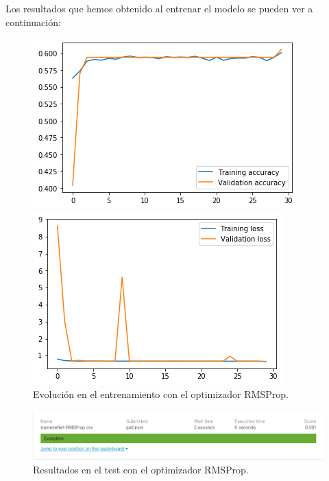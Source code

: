 \documentclass[11pt,a4paper]{article}
\begin{document}
Los resultados que hemos obtenido al entrenar el modelo se pueden ver a continuación:

\begin{figure}[H]
\centering
\begin{minipage}{0.5\textwidth}
  \centering
  \includegraphics[scale=0.5]{img/accuracy-rmsprop.png}
\end{minipage}%
\begin{minipage}{0.5\textwidth}
  \centering
  \includegraphics[scale=0.5]{img/loss-rmsprop.png}
\end{minipage}
\caption{Evolución en el entrenamiento con el optimizador RMSProp.}
\label{fig:graph-rmsprop}
\end{figure}

\begin{figure}[H]
    \centering
    \includegraphics[scale=0.55]{img/siameseNet-rmsprop.png}
    \caption{Resultados en el test con el optimizador RMSProp.}
    \label{fig:test-rmsprop}
\end{figure}
\end{document}
